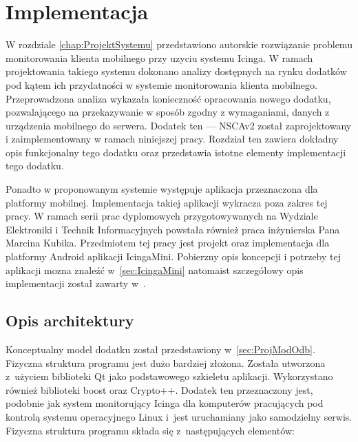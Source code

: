 \chapter{Implementacja}
\label{chap:Implementacja}

W rozdziale \ref{chap:ProjektSystemu} przedstawiono autorskie
rozwiązanie problemu monitorowania klienta mobilnego przy uzyciu
systemu Icinga. W ramach projektowania takiego systemu dokonano
analizy dostępnych na rynku dodatków pod kątem ich przydatności w
systemie monitorowania klienta mobilnego. Przeprowadzona analiza
wykazała konieczność opracowania nowego dodatku, pozwalającego na
przekazywanie w sposób zgodny z wymaganiami, danych z urządzenia
mobilnego do serwera.  Dodatek ten --- NSCAv2 został zaprojektowany i
zaimplementowany w ramach niniejszej pracy. Rozdział ten zawiera
dokładny opis funkcjonalny tego dodatku oraz przedstawia istotne
elementy implementacji tego dodatku.

Ponadto w proponowanym systemie występuje aplikacja przeznaczona dla
platformy mobilnej. Implementacja takiej aplikacji wykracza poza
zakres tej pracy.  W ramach serii prac dyplomowych przygotowywanych na
Wydziale Elektroniki i Technik Informacyjnych powstała również praca
inżynierska Pana Marcina Kubika. Przedmiotem tej pracy jest projekt
oraz implementacja dla platformy Android aplikacji
IcingaMini. Pobierzny opis koncepcji i potrzeby tej aplikacji mozna
znaleźć w~\ref{sec:IcingaMini} natomaist szczegółowy opis
implementacji został zawarty w~\cite{book:pracaKubika}.

\section[Opis architektury][Opis architektury]{Opis architektury}


Konceptualny model dodatku został przedstawiony
w~\ref{sec:ProjModOdb}. Fizyczna struktura programu jest dużo bardziej
złożona. Została utworzona z~użyciem biblioteki Qt jako podstawowego
szkieletu aplikacji. Wykorzystano również biblioteki boost oraz
Crypto++. Dodatek ten przeznaczony jest, podobnie jak system
monitorujący Icinga dla komputerów pracujących pod kontrolą systemu
operacyjnego Linux i~jest uruchamiany jako samodzielny
serwis. Fizyczna struktura programu składa się z~następujących
elementów:


